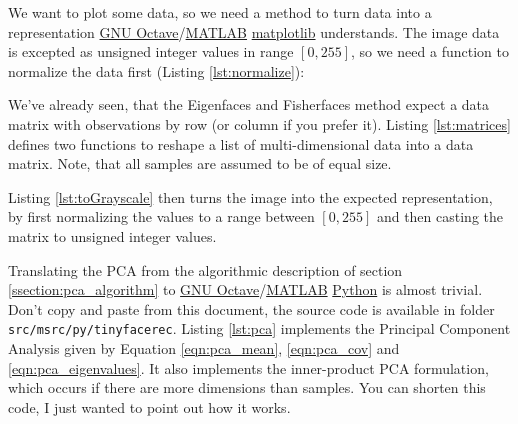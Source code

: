 \ifx\python\undefined
	
\else
	
\fi

We want to plot some data, so we need a method to turn data into a representation \ifx\python\undefined \href{http://www.gnu.org/software/octave/}{GNU Octave}/\href{http://www.mathworks.com}{MATLAB} \else \href{http://matplotlib.sourceforge.net/}{matplotlib} \fi understands. The image data is excepted as unsigned integer values in range $[0,255]$, so we need a function to normalize the data first (Listing \ref{lst:normalize}):

\ifx\python\undefined
	
\else
	
\fi

\ifx\python\undefined
\else
	We've already seen, that the Eigenfaces and Fisherfaces method expect a data matrix with observations by row (or column if you prefer it). Listing \ref{lst:matrices} defines two functions to reshape a list of multi-dimensional data into a data matrix. Note, that all samples are assumed to be of equal size.

	
\fi

\ifx\python\undefined
	Listing \ref{lst:toGrayscale} then turns the image into the expected representation, by first normalizing the values to a range between $[0,255]$ and then casting the matrix to unsigned integer values.
	
	
\fi

Translating the PCA from the algorithmic description of section \ref{ssection:pca_algorithm} to \ifx\python\undefined \href{http://www.gnu.org/software/octave/}{GNU Octave}/\href{http://www.mathworks.com}{MATLAB} \else \href{http://www.python.org}{Python} \fi is almost trivial. Don't copy and paste from this document, the source code is available in folder \ifx\python\undefined \lstinline|src/m|\else \lstinline|src/py/tinyfacerec|\fi. Listing \ref{lst:pca} implements the Principal Component Analysis given by Equation \ref{eqn:pca_mean}, \ref{eqn:pca_cov} and \ref{eqn:pca_eigenvalues}. It also implements the inner-product PCA formulation, which occurs if there are more dimensions than samples. You can shorten this code, I just wanted to point out how it works.

